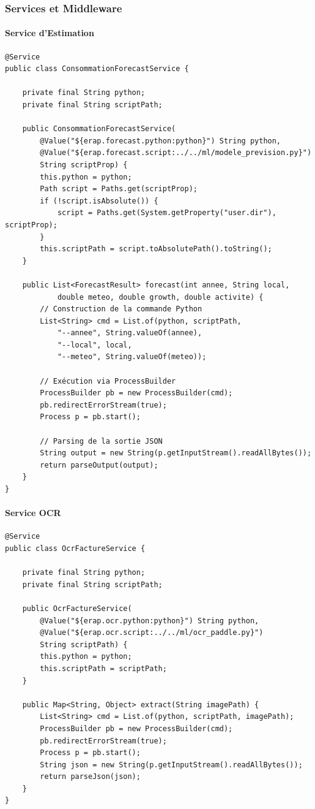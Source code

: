 \documentclass[12pt,a4paper]{article}
\begin{document}
\subsubsection{Services et Middleware}

\paragraph{Service d'Estimation}
\begin{lstlisting}[style=java, caption=Service d'estimation par CAGR historique]
@Service
public class ConsommationForecastService {

    private final String python;
    private final String scriptPath;

    public ConsommationForecastService(
        @Value("${erap.forecast.python:python}") String python,
        @Value("${erap.forecast.script:../../ml/modele_prevision.py}")
        String scriptProp) {
        this.python = python;
        Path script = Paths.get(scriptProp);
        if (!script.isAbsolute()) {
            script = Paths.get(System.getProperty("user.dir"), scriptProp);
        }
        this.scriptPath = script.toAbsolutePath().toString();
    }

    public List<ForecastResult> forecast(int annee, String local,
            double meteo, double growth, double activite) {
        // Construction de la commande Python
        List<String> cmd = List.of(python, scriptPath,
            "--annee", String.valueOf(annee),
            "--local", local,
            "--meteo", String.valueOf(meteo));

        // Exécution via ProcessBuilder
        ProcessBuilder pb = new ProcessBuilder(cmd);
        pb.redirectErrorStream(true);
        Process p = pb.start();

        // Parsing de la sortie JSON
        String output = new String(p.getInputStream().readAllBytes());
        return parseOutput(output);
    }
}
\end{lstlisting}

\paragraph{Service OCR}
\begin{lstlisting}[style=java, caption=Service d'extraction OCR via PaddleOCR]
@Service
public class OcrFactureService {

    private final String python;
    private final String scriptPath;

    public OcrFactureService(
        @Value("${erap.ocr.python:python}") String python,
        @Value("${erap.ocr.script:../../ml/ocr_paddle.py}")
        String scriptPath) {
        this.python = python;
        this.scriptPath = scriptPath;
    }

    public Map<String, Object> extract(String imagePath) {
        List<String> cmd = List.of(python, scriptPath, imagePath);
        ProcessBuilder pb = new ProcessBuilder(cmd);
        pb.redirectErrorStream(true);
        Process p = pb.start();
        String json = new String(p.getInputStream().readAllBytes());
        return parseJson(json);
    }
}
\end{lstlisting}
\end{document}

